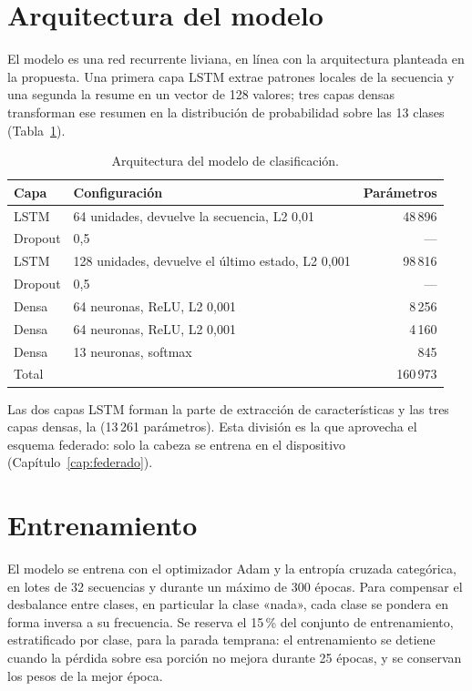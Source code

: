 \section{Arquitectura del modelo}

El modelo es una red recurrente liviana, en línea con la arquitectura planteada en la propuesta. Una primera capa LSTM extrae patrones locales de la secuencia y una segunda la resume en un vector de 128 valores; tres capas densas transforman ese resumen en la distribución de probabilidad sobre las 13 clases (Tabla~\ref{tab:arquitectura}).

\begin{table}[h]
    \centering
    \begin{tabular}{llr}
        \toprule
        Capa & Configuración & Parámetros \\
        \midrule
        LSTM & 64 unidades, devuelve la secuencia, L2 0,01 & 48\,896 \\
        Dropout & 0,5 & --- \\
        LSTM & 128 unidades, devuelve el último estado, L2 0,001 & 98\,816 \\
        Dropout & 0,5 & --- \\
        Densa & 64 neuronas, ReLU, L2 0,001 & 8\,256 \\
        Densa & 64 neuronas, ReLU, L2 0,001 & 4\,160 \\
        Densa & 13 neuronas, softmax & 845 \\
        \midrule
        Total & & 160\,973 \\
        \bottomrule
    \end{tabular}
    \caption{Arquitectura del modelo de clasificación.}
    \label{tab:arquitectura}
\end{table}

Las dos capas LSTM forman la parte de extracción de características y las tres capas densas, la  (13\,261 parámetros). Esta división es la que aprovecha el esquema federado: solo la cabeza se entrena en el dispositivo (Capítulo~\ref{cap:federado}).

\section{Entrenamiento}

El modelo se entrena con el optimizador Adam y la entropía cruzada categórica, en lotes de 32 secuencias y durante un máximo de 300 épocas. Para compensar el desbalance entre clases, en particular la clase «nada», cada clase se pondera en forma inversa a su frecuencia. Se reserva el 15\,\% del conjunto de entrenamiento, estratificado por clase, para la parada temprana: el entrenamiento se detiene cuando la pérdida sobre esa porción no mejora durante 25 épocas, y se conservan los pesos de la mejor época.

